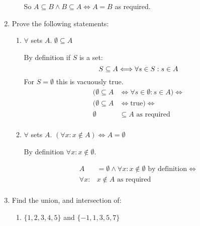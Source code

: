 \documentclass[10pt,\jkfside,a4paper]{article}
\begin{document}
\begin{enumerate}
\begin{enumerate}
So $A \subseteq B \wedge B \subseteq A \Longleftrightarrow A = B$ as required.

\end{enumerate}

\item Prove the following statements:

\begin{enumerate}

\item $\forall$ sets $A$. $\emptyset \subseteq A$

By definition if $S$ is a set:
\begin{equation}
S \subseteq A \Longleftrightarrow \forall s \in S: s \in A\\
\end{equation}
For $S = \emptyset$ this is vacuously true.
\begin{equation}
\begin{split}
(\emptyset \subseteq A &\Longleftrightarrow \forall s \in \emptyset: s \in A)\Longleftrightarrow\\
(\emptyset \subseteq A &\Longleftrightarrow \text{true})\Longleftrightarrow\\
\emptyset &\subseteq A\text{ as required}\\
\end{split}
\end{equation}

\item $\forall$ sets $A$. $(\forall x: x \notin A) \Longleftrightarrow A = \emptyset$

By definition $\forall x: x \notin \emptyset$. 

\begin{equation}
\begin{split}
A &= \emptyset \wedge \forall x: x \notin \emptyset \text{ by definition} \Longleftrightarrow\\
\forall x:& x \notin A \text{ as required}\\
\end{split}
\end{equation}

\end{enumerate}

\item Find the union, and intersection of: 

\begin{enumerate}

\item $\{1, 2, 3, 4, 5\}$ and $\{-1, 1, 3, 5, 7\}$


\end{enumerate}
\end{enumerate}
\end{document}
